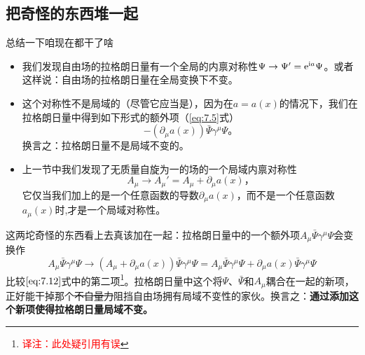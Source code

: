 \subsection{把奇怪的东西堆一起}\label{sec7.1.3}
总结一下咱现在都干了啥
\begin{itemize}
\item 我们发现\spint 自由场的拉格朗日量有一个全局的内禀对称性$\Psi\rightarrow\Psi' = \mathrm e^{\mathrm i a}\Psi$。或者这样说：\spint 自由场的拉格朗日量在全局\uo 变换下不变。
\item 这个对称性不是局域的（尽管它应当是），因为在$a=a(x)$的情况下，我们在拉格朗日量中得到如下形式的额外项（\ref{eq:7.5}式）
\begin{equation}
-(\partial_\mu a(x))\bar\Psi\gamma^\mu\Psi \text{。}
\label{eq:7.12}
\end{equation}
换言之：拉格朗日量不是局域\uo 不变的。
\item 上一节中我们发现了无质量自旋为一的场的一个局域内禀对称性
\begin{equation}
A_\mu \rightarrow A_\mu' = A_\mu +\partial_\mu a(x) \text{，}
\label{eq:7.13}
\end{equation}
它仅当我们加上的是一个任意函数的导数$\partial_\mu a(x)$，而不是一个任意函数$a_\mu(x)$时,才是一个局域对称性。
\end{itemize}
这两坨奇怪的东西看上去真该加在一起：拉格朗日量中的一个额外项$A_\mu\bar\Psi\gamma^\mu\Psi$会变换作
\begin{equation}
A_\mu\bar\Psi\gamma^\mu\Psi \rightarrow (A_\mu+\partial_\mu a(x))\bar\Psi\gamma^\mu\Psi = A_\mu\bar\Psi\gamma^\mu\Psi + \partial_\mu a(x)\bar\Psi\gamma^\mu\Psi
\end{equation}
比较$\ref{eq:7.12}$式中的第二项\footnote{\textcolor{red}{译注：此处疑引用有误}}。拉格朗日量中这个将$\Psi$、$\bar\Psi$和$A_\mu$耦合在一起的新项，正好能干掉那个\sout{不自量力}阻挡\spint 自由场拥有局域\uo 不变性的家伙。换言之：{\bf 通过添加这个新项使得拉格朗日量局域\uo 不变。}

